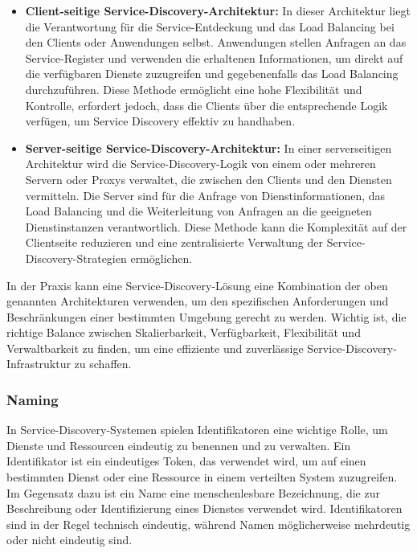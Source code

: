 \documentclass[../vs-script-first-v01.tex]{subfiles}
\begin{document}
\begin{itemize}
\item \textbf{Client-seitige Service-Discovery-Architektur:} In dieser Architektur liegt die Verantwortung für die Service-Entdeckung und das Load Balancing bei den Clients oder Anwendungen selbst. Anwendungen stellen Anfragen an das Service-Register und verwenden die erhaltenen Informationen, um direkt auf die verfügbaren Dienste zuzugreifen und gegebenenfalls das Load Balancing durchzuführen. Diese Methode ermöglicht eine hohe Flexibilität und Kontrolle, erfordert jedoch, dass die Clients über die entsprechende Logik verfügen, um Service Discovery effektiv zu handhaben.

\item \textbf{Server-seitige Service-Discovery-Architektur:} In einer serverseitigen Architektur wird die Service-Discovery-Logik von einem oder mehreren Servern oder Proxys verwaltet, die zwischen den Clients und den Diensten vermitteln. Die Server sind für die Anfrage von Dienstinformationen, das Load Balancing und die Weiterleitung von Anfragen an die geeigneten Dienstinstanzen verantwortlich. Diese Methode kann die Komplexität auf der Clientseite reduzieren und eine zentralisierte Verwaltung der Service-Discovery-Strategien ermöglichen.
\end{itemize}

In der Praxis kann eine Service-Discovery-Lösung eine Kombination der oben genannten Architekturen verwenden, um den spezifischen Anforderungen und Beschränkungen einer bestimmten Umgebung gerecht zu werden. Wichtig ist, die richtige Balance zwischen Skalierbarkeit, Verfügbarkeit, Flexibilität und Verwaltbarkeit zu finden, um eine effiziente und zuverlässige Service-Discovery-Infrastruktur zu schaffen.

\subsubsection{Naming}

In Service-Discovery-Systemen spielen Identifikatoren eine wichtige Rolle, um Dienste und Ressourcen eindeutig zu benennen und zu verwalten. Ein Identifikator ist ein eindeutiges Token, das verwendet wird, um auf einen bestimmten Dienst oder eine Ressource in einem verteilten System zuzugreifen. Im Gegensatz dazu ist ein Name eine menschenlesbare Bezeichnung, die zur Beschreibung oder Identifizierung eines Dienstes verwendet wird. Identifikatoren sind in der Regel technisch eindeutig, während Namen möglicherweise mehrdeutig oder nicht eindeutig sind.
\end{document}
